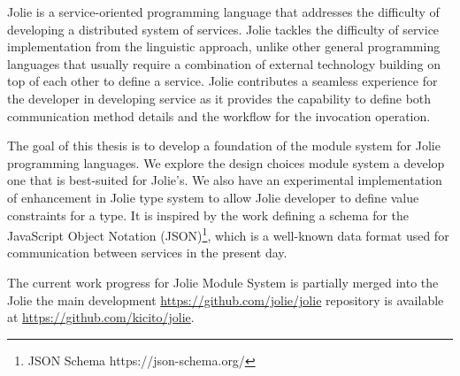 Jolie\cite{JOLIE} is a service-oriented programming language that addresses the difficulty of developing a distributed system of services. Jolie tackles the difficulty of service implementation from the linguistic approach, unlike other general programming languages that usually require a combination of external technology building on top of each other to define a service. Jolie contributes a seamless experience for the developer in developing service as it provides the capability to define both communication method details and the workflow for the invocation operation.

The goal of this thesis is to develop a foundation of the module system for Jolie programming languages. We explore the design choices module system a develop one that is best-suited for Jolie's. We also have an experimental implementation of enhancement in Jolie type system to allow Jolie developer to define value constraints for a type. It is inspired by the work defining a schema for the JavaScript Object Notation (JSON)\footnote{JSON Schema https://json-schema.org/}, which is a well-known
data format used for communication between services in the present day.

The current work progress for Jolie Module System is partially merged into the Jolie the main development \url{https://github.com/jolie/jolie} repository is available at \url{https://github.com/kicito/jolie}.

% 
% 






